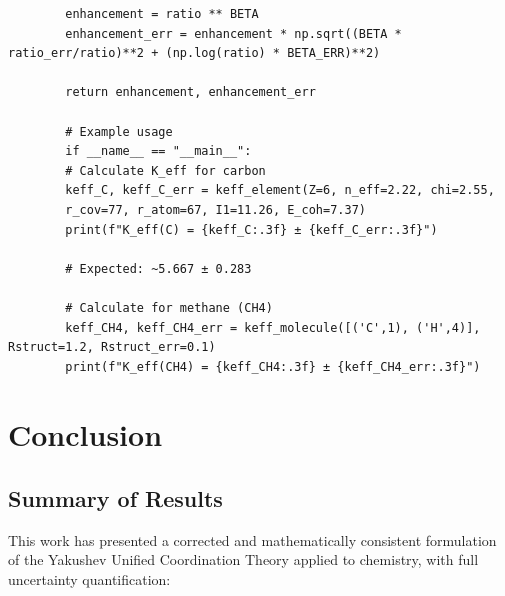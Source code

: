 \documentclass[12pt,a4paper]{article}
\theoremstyle{remark}
\begin{document}
\begin{verbatim}
		enhancement = ratio ** BETA
		enhancement_err = enhancement * np.sqrt((BETA * ratio_err/ratio)**2 + (np.log(ratio) * BETA_ERR)**2)
		
		return enhancement, enhancement_err
		
		# Example usage
		if __name__ == "__main__":
		# Calculate K_eff for carbon
		keff_C, keff_C_err = keff_element(Z=6, n_eff=2.22, chi=2.55, 
		r_cov=77, r_atom=67, I1=11.26, E_coh=7.37)
		print(f"K_eff(C) = {keff_C:.3f} ± {keff_C_err:.3f}")
		
		# Expected: ~5.667 ± 0.283
		
		# Calculate for methane (CH4)
		keff_CH4, keff_CH4_err = keff_molecule([('C',1), ('H',4)], Rstruct=1.2, Rstruct_err=0.1)
		print(f"K_eff(CH4) = {keff_CH4:.3f} ± {keff_CH4_err:.3f}")
	\end{verbatim}
	
	\section{Conclusion}
	\label{sec:conclusion}
	
	\subsection{Summary of Results}
	
	This work has presented a corrected and mathematically consistent formulation of the Yakushev Unified Coordination Theory applied to chemistry, with full uncertainty quantification:
	
\end{document}
